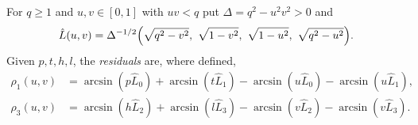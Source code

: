 For $q\ge1$ and $u,v\in[0,1]$ with $uv<q$ put $\Delta=q^2-u^2v^2>0$ and
\begin{equation}\label{eq:core}
  \hat L(u,v)=\Delta^{-1/2}\Bigl(\sqrt{q^2-v^2},\ \sqrt{1-v^2},\
  \sqrt{1-u^2},\ \sqrt{q^2-u^2}\Bigr).
\end{equation}
Given $p,t,h,l$, the \emph{residuals} are, where defined,
\begin{align*}
  \rho_1(u,v)&=\arcsin(p\hat L_0)+\arcsin(t\hat L_1)-\arcsin(u\hat L_0)-\arcsin(u\hat L_1),\\
  \rho_3(u,v)&=\arcsin(h\hat L_2)+\arcsin(l\hat L_3)-\arcsin(v\hat L_2)-\arcsin(v\hat L_3).
\end{align*}

